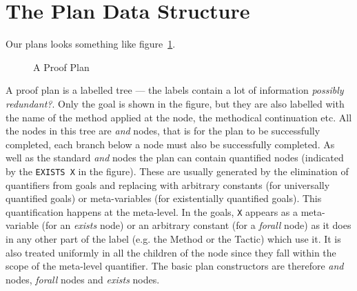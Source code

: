 \section{The Plan Data Structure}
Our plans looks something like figure~\ref{fig:andplan}.
\begin{figure}[htb]
\begin{center}\leavevmode
{}
\end{center}
\caption{A Proof Plan}
\label{fig:andplan}
\end{figure}
A proof plan is a labelled tree
--- the labels contain a lot of information {\em possibly redundant?}.
Only the goal is shown in the figure, but they are also
labelled with the name of the method applied at the
node, the methodical continuation etc.
All the nodes in this tree are {\em and} nodes, that
is for the plan to be successfully completed, each branch below a node
must also be successfully completed.  As well as the standard {\em
  and} nodes the plan can contain quantified nodes (indicated by the
{\tt EXISTS X} in the figure).  These are usually generated by the
elimination of quantifiers from goals and replacing with arbitrary
constants (for universally quantified goals) or
meta-variables (for existentially quantified
goals).  This quantification happens at the meta-level.  In the goals,
{\tt X} appears as a meta-variable (for an {\em exists}
node) or an arbitrary constant (for a {\em forall}
node) as it does in any other part of the label
(e.g. the Method or the Tactic) which use it.  It is also treated
uniformly in all the children of the node since they fall within the
scope of the meta-level quantifier.  The basic plan
constructors are therefore {\em and} nodes,
{\em forall} nodes and {\em exists} nodes.

